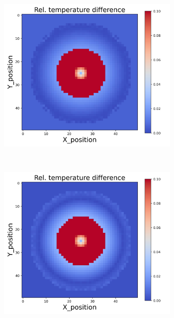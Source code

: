 \begin{figure}[h]
\begin{minipage}{\textwidth}
\begin{subfigure}{0.3\textwidth}
        \end{subfigure}
        \begin{subfigure}{0.3\textwidth}
            \centering
            \includegraphics[width=\textwidth]{figures/raw_data/21/quad/T_bias.jpg}
        \end{subfigure}
    \end{minipage}\\
    \begin{minipage}{\textwidth}
        \centering
        \begin{subfigure}{0.3\textwidth}
            \centering
            \includegraphics[width=\textwidth]{figures/raw_data/22/quad/T_bias.jpg}

\end{subfigure}
\end{minipage}
\end{figure}
